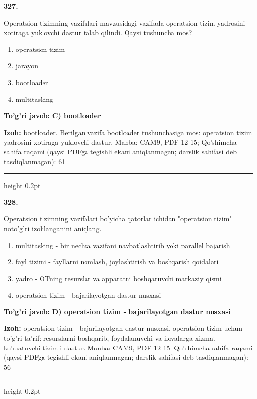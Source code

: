\documentclass[10pt,a4paper]{article}
\begin{document}
{\bfseries\sffamily\color{ink} 327.}
\par
Operatsion tizimning vazifalari mavzusidagi vazifada operatsion tizim yadrosini xotiraga yuklovchi dastur talab qilindi. Qaysi tushuncha mos?
\begin{enumerate}[label=\Alph*),leftmargin=9mm]
\item operatsion tizim
\item jarayon
\item bootloader
\item multitasking
\end{enumerate}
\begin{tcolorbox}[enhanced,breakable,colback=teal!4,colframe=teal!60!black,boxrule=0.45pt,arc=1.2mm,left=2.7mm,right=2.7mm,top=1.8mm,bottom=1.8mm,before skip=2mm,after skip=2mm]
{\bfseries\sffamily\color{teal}To'g'ri javob:} \textbf{C) bootloader}
\par\smallskip
{\bfseries Izoh:} bootloader. Berilgan vazifa bootloader tushunchasiga mos: operatsion tizim yadrosini xotiraga yuklovchi dastur. Manba: CAM9, PDF 12-15; Qo'shimcha sahifa raqami (qaysi PDFga tegishli ekani aniqlanmagan; darslik sahifasi deb tasdiqlanmagan): 61
\end{tcolorbox}
\vspace{2mm}\hrule height 0.2pt\vspace{3mm}

{\bfseries\sffamily\color{ink} 328.}
\par
Operatsion tizimning vazifalari bo'yicha qatorlar ichidan "operatsion tizim" noto'g'ri izohlanganini aniqlang.
\begin{enumerate}[label=\Alph*),leftmargin=9mm]
\item multitasking - bir nechta vazifani navbatlashtirib yoki parallel bajarish
\item fayl tizimi - fayllarni nomlash, joylashtirish va boshqarish qoidalari
\item yadro - OTning resurslar va apparatni boshqaruvchi markaziy qismi
\item operatsion tizim - bajarilayotgan dastur nusxasi
\end{enumerate}
\begin{tcolorbox}[enhanced,breakable,colback=teal!4,colframe=teal!60!black,boxrule=0.45pt,arc=1.2mm,left=2.7mm,right=2.7mm,top=1.8mm,bottom=1.8mm,before skip=2mm,after skip=2mm]
{\bfseries\sffamily\color{teal}To'g'ri javob:} \textbf{D) operatsion tizim - bajarilayotgan dastur nusxasi}
\par\smallskip
{\bfseries Izoh:} operatsion tizim - bajarilayotgan dastur nusxasi. operatsion tizim uchun to'g'ri ta'rif: resurslarni boshqarib, foydalanuvchi va ilovalarga xizmat ko'rsatuvchi tizimli dastur. Manba: CAM9, PDF 12-15; Qo'shimcha sahifa raqami (qaysi PDFga tegishli ekani aniqlanmagan; darslik sahifasi deb tasdiqlanmagan): 56
\end{tcolorbox}
\vspace{2mm}\hrule height 0.2pt\vspace{3mm}
\end{document}
